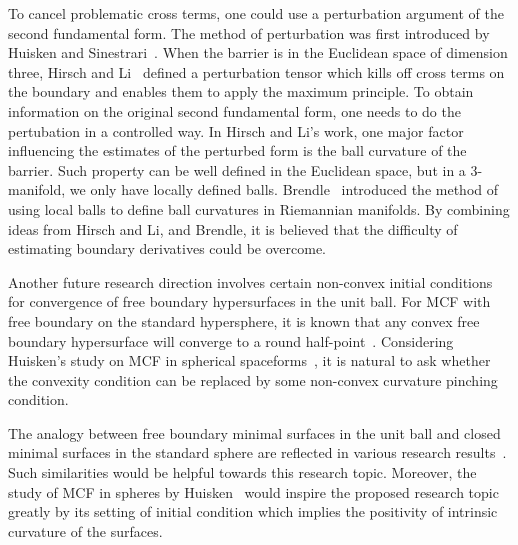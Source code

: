 To cancel problematic cross terms, one could use a perturbation argument of the second fundamental form. The method of perturbation was first introduced by Huisken and Sinestrari~\cite{huisken_convexity_1999}. When the barrier is in the Euclidean space of dimension three, Hirsch and Li~\cite{hirsch2020contracting} defined a perturbation tensor which kills off cross terms on the boundary and enables them to apply the maximum principle. To obtain information on the original second fundamental form, one needs to do the pertubation in a controlled way. In Hirsch and Li's work, one major factor influencing the estimates of the perturbed form is the ball curvature of the barrier. Such property can be well defined in the Euclidean space, but in a 3-manifold, we only have locally defined balls. Brendle~\cite{brendle2013inscribed} introduced the method of using local balls to define ball curvatures in Riemannian manifolds. By combining ideas from Hirsch and Li, and Brendle, it is believed that the difficulty of estimating boundary derivatives could be overcome.

Another future research direction involves certain non-convex initial conditions for convergence of free boundary hypersurfaces in the unit ball. For MCF with free boundary on the standard hypersphere, it is known that any convex free boundary hypersurface will converge to a round half-point~\cite{stahl_convergence_1996}. Considering Huisken's study on MCF in spherical spaceforms~\cite{huisken_deforming_1987}, it is natural to ask whether the convexity condition can be replaced by some non-convex curvature pinching condition.

The analogy between free boundary minimal surfaces in the unit ball and closed minimal surfaces in the standard sphere are reflected in various research results~\cite{almgren_interior_1966,nitsche_stationary_1985,Ros_stabilityof,Li2020free}. Such similarities would be helpful towards this research topic. Moreover, the study of MCF in spheres by Huisken~\cite{huisken_deforming_1987} would inspire the proposed research topic greatly by its setting of initial condition which implies the positivity of intrinsic curvature of the surfaces.












\chapterend

